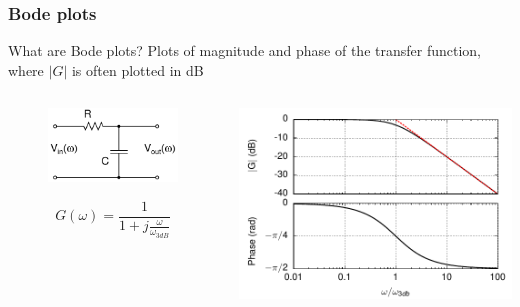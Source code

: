 \documentclass[beamer]{standalone}
\begin{document}
\begin{frame}
\frametitle{Bode plots}
 \begin{block}{What are Bode plots?}
  Plots of magnitude and phase of the transfer function, where
  $|G|$ is often plotted in dB
 \end{block}
   \begin{columns}[c]
    \begin{column}{.25\textwidth}
     \begin{figure}
      \includegraphics[width=1.00\textwidth]{./circuits/rc_low_pass.pdf}
     \end{figure}
    \[ G(\omega)
    = \frac{1}{1+j\frac{\omega}{\omega_{3dB}}}
    \]
    \end{column}
    \begin{column}{.75\textwidth}
      \includegraphics[angle=0,width=1.00\textwidth]{./plots/rc_low_pass_bode.pdf}
    \end{column}
   \end{columns}
\end{frame}
\end{document}
